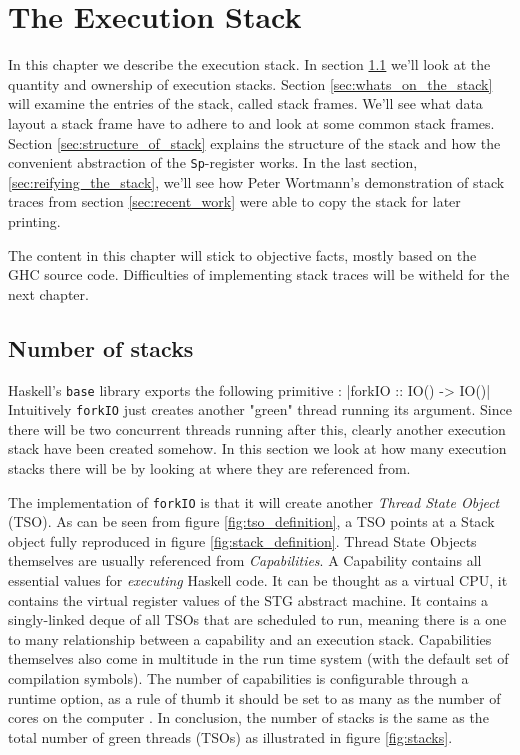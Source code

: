 \chapter{The Execution Stack}

In this chapter we describe the execution stack. In section
\ref{sec:number_of_stacks} we'll look at the quantity and ownership of
execution stacks. Section \ref{sec:whats_on_the_stack} will examine the
entries of the stack, called stack frames. We'll see what data layout
a stack frame have to adhere to and look at some common stack
frames. Section \ref{sec:structure_of_stack} explains the structure of
the stack and how the convenient abstraction of the \texttt{Sp}-register
works. In the last section, \ref{sec:reifying_the_stack}, we'll see
how Peter Wortmann's demonstration of stack traces from section
\ref{sec:recent_work} were able to copy the stack for later printing.

The content in this chapter will stick to objective facts, mostly based
on the GHC source code. Difficulties of implementing stack traces will
be witheld for the next chapter.

\section{Number of stacks} \label{sec:number_of_stacks}

Haskell's \texttt{base} library exports the following primitive \cite{base_forkIO}:
|forkIO :: IO() -> IO()|
Intuitively \texttt{forkIO} just creates another "green" thread running its argument.
Since there will be two concurrent threads running after this, clearly
another execution stack have been created somehow. In this section we
look at how many execution stacks there will be by looking at
where they are referenced from.

The implementation of \texttt{forkIO} is
that it will create another \emph{Thread State Object} (TSO). As
can be seen from figure \ref{fig:tso_definition}, a TSO points at a
Stack object fully reproduced in figure \ref{fig:stack_definition}.
Thread State Objects themselves are usually referenced from \emph{Capabilities}.
A Capability contains all essential values for \emph{executing}
Haskell code. It can be thought as a virtual CPU, it contains
the virtual register values of the STG abstract machine. It contains
a singly-linked deque of all TSOs that are scheduled to run, meaning
there is a one to many relationship between a capability and an execution
stack. Capabilities themselves also come in multitude in the run time
system (with the default set of compilation symbols). The number of
capabilities is configurable through a runtime option, as a rule of
thumb it should be set to as many as the number of cores on the computer
\cite{commentary_capabilities}. In conclusion, the number of stacks is
the same as the total number of green threads (TSOs) as illustrated in
figure \ref{fig:stacks}.

